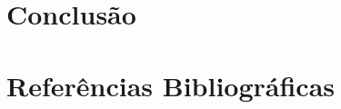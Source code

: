 \documentclass[grad,numbers]{coppe}
\begin{document}
  \hypertarget{conclusuxe3o}{%
  \chapter{Conclusão}\label{conclusuxe3o}}

  \backmatter

  \hypertarget{referuxeancias-bibliogruxe1ficas}{%
  \chapter*{Referências Bibliográficas}\label{referuxeancias-bibliogruxe1ficas}}


  \label{bib:begin}
  \noindent

  \setlength{\parindent}{-0.20in}
  \setlength{\leftskip}{0.20in}
  \setlength{\parskip}{8pt}
\end{document}
